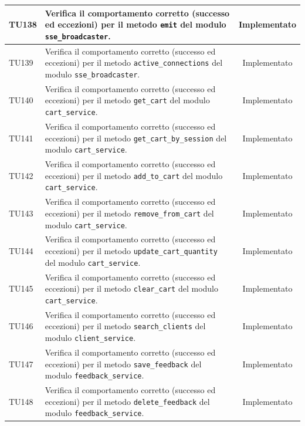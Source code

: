 \documentclass[a4paper,11pt,oneside]{scrartcl}
\begin{document}
\begin{longtable}{|p{1.9cm}|p{11.6cm}|c|}
    TU138           & Verifica il comportamento corretto (successo ed eccezioni) per il metodo \texttt{emit} del modulo \texttt{sse\_broadcaster}.                                 & Implementato   \\ \hline
    TU139           & Verifica il comportamento corretto (successo ed eccezioni) per il metodo \texttt{active\_connections} del modulo \texttt{sse\_broadcaster}.                  & Implementato   \\ \hline
    TU140           & Verifica il comportamento corretto (successo ed eccezioni) per il metodo \texttt{get\_cart} del modulo \texttt{cart\_service}.                               & Implementato   \\ \hline
    TU141           & Verifica il comportamento corretto (successo ed eccezioni) per il metodo \texttt{get\_cart\_by\_session} del modulo \texttt{cart\_service}.                  & Implementato   \\ \hline
    TU142           & Verifica il comportamento corretto (successo ed eccezioni) per il metodo \texttt{add\_to\_cart} del modulo \texttt{cart\_service}.                           & Implementato   \\ \hline
    TU143           & Verifica il comportamento corretto (successo ed eccezioni) per il metodo \texttt{remove\_from\_cart} del modulo \texttt{cart\_service}.                      & Implementato   \\ \hline
    TU144           & Verifica il comportamento corretto (successo ed eccezioni) per il metodo \texttt{update\_cart\_quantity} del modulo \texttt{cart\_service}.                  & Implementato   \\ \hline
    TU145           & Verifica il comportamento corretto (successo ed eccezioni) per il metodo \texttt{clear\_cart} del modulo \texttt{cart\_service}.                             & Implementato   \\ \hline
    TU146           & Verifica il comportamento corretto (successo ed eccezioni) per il metodo \texttt{search\_clients} del modulo \texttt{client\_service}.                       & Implementato   \\ \hline
    TU147           & Verifica il comportamento corretto (successo ed eccezioni) per il metodo \texttt{save\_feedback} del modulo \texttt{feedback\_service}.                      & Implementato   \\ \hline
    TU148           & Verifica il comportamento corretto (successo ed eccezioni) per il metodo \texttt{delete\_feedback} del modulo \texttt{feedback\_service}.                    & Implementato   \\ \hline

\end{longtable}
\end{document}
